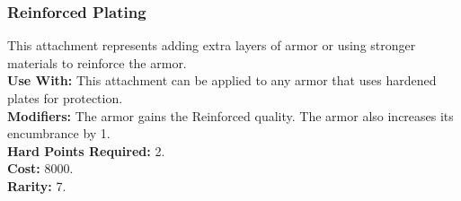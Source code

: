 \subsubsection{Reinforced Plating}
This attachment represents adding extra layers of armor
or using stronger materials to reinforce the armor.\\
\textbf{Use With:} This attachment can be applied to any armor
    that uses hardened plates for protection.\\
\textbf{Modifiers:} The armor gains the Reinforced quality. The
    armor also increases its encumbrance by 1.\\
\textbf{Hard Points Required:} 2.\\
\textbf{Cost:} 8000.\\
\textbf{Rarity:} 7.\\
